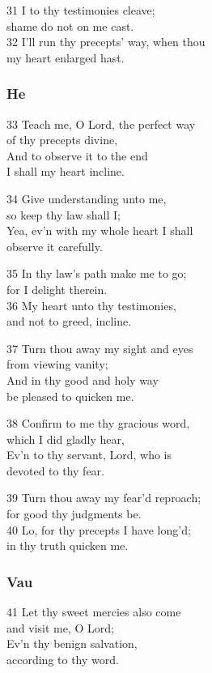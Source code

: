 31 I to thy testimonies cleave;\\
shame do not on me cast.\\
32 I’ll run thy precepts’ way, when thou\\
my heart enlarged hast.

\subsubsection*{He}

33 Teach me, O Lord, the perfect way\\
of thy precepts divine,\\
And to observe it to the end\\
I shall my heart incline.

34 Give understanding unto me,\\
so keep thy law shall I;\\
Yea, ev’n with my whole heart I shall\\
observe it carefully.

35 In thy law’s path make me to go;\\
for I delight therein.\\
36 My heart unto thy testimonies,\\
and not to greed, incline.

37 Turn thou away my sight and eyes\\
from viewing vanity;\\
And in thy good and holy way\\
be pleased to quicken me.

38 Confirm to me thy gracious word,\\
which I did gladly hear,\\
Ev’n to thy servant, Lord, who is\\
devoted to thy fear.

39 Turn thou away my fear’d reproach;\\
for good thy judgments be.\\
40 Lo, for thy precepts I have long’d;\\
in thy truth quicken me.

\subsubsection*{Vau}

41 Let thy sweet mercies also come\\
and visit me, O Lord;\\
Ev’n thy benign salvation,\\
according to thy word.

